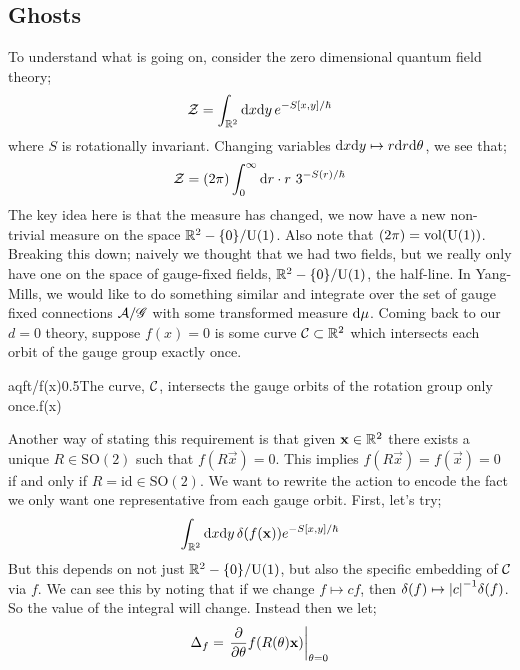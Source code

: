 \subsection{Ghosts}
To understand what is going on, consider the zero dimensional quantum field theory;
\begin{equation*}
\mathcal{Z} = \int_{\mathbb{R}^2}{\text{d} x \text{d}y \,e^{-S[x,y]/\hbar}}
\end{equation*}
where $S$ is rotationally invariant. Changing variables $\text{d} x \text{d} y \mapsto r \text{d} r \text{d} \theta$, we see that;
\begin{equation*}
\mathcal{Z} = (2\pi)\int_0^{\infty}{\text{d} r \cdot r\,\,3^{-S(r)/\hbar}}
\end{equation*}
The key idea here is that the measure has changed, we now have a new non-trivial measure on the space $\RR^2 - \set{0}/\Uni{1}$. Also note that $(2\pi) = \text{vol}(\Uni{1})$. Breaking this down; naively we thought that we had two fields, but we really only have one on the space of gauge-fixed fields, $\RR^2 - \set{0}/\Uni{1}$, the half-line. In Yang-Mills, we would like to do something similar and integrate over the set of gauge fixed connections $\mathcal{A}/\mathscr{G}$ with some transformed measure $\text{d} \mu$. Coming back to our $d = 0$ theory, suppose $f(x) = 0$ is some curve $\mathcal{C} \subset \mathbb{R}^2$ which intersects each orbit of the gauge group exactly once.
\begin{mygraphic}{aqft/f(x)}{0.5}{The curve, $\mathcal{C}$, intersects the gauge orbits of the rotation group only once.}{f(x)}\end{mygraphic}
Another way of stating this requirement is that given $\mathbf{x} \in \mathbb{R}^2$ there exists a unique $R \in \text{SO}(2)$ such that $f(R\vec{x}) = 0$. This implies $f(R\vec{x}) = f(\vec{x}) = 0$ if and only if $R = \text{id} \in \text{SO}(2)$. We want to rewrite the action to encode the fact we only want one representative from each gauge orbit. First, let's try;
\begin{equation*}
\int_{\RR^2}{\ud x \upd{y} \delta\left(f(\vec{x})\right) e^{-S[x, y]/\hbar}}
\end{equation*}
But this depends on not just $\RR^2 - \set{0}/\Uni{1}$, but also the specific embedding of $\mathcal{C}$ via $f$. We can see this by noting that if we change $f \mapsto cf$, then $\delta(f) \mapsto \abs{c}^{-1}\delta(f)$. So the value of the integral will change. Instead then we let;
\begin{equation*}
\Delta_f = \left.\frac{\del}{\del \theta}f\left(R(\theta)\vec{x}\right)\right|_{\theta = 0}
\end{equation*}
